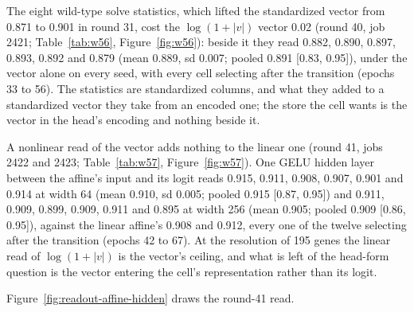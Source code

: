 The eight wild-type solve statistics, which lifted the standardized vector from
0.871 to 0.901 in round 31, cost the $\log(1 + |v|)$ vector 0.02 (round 40, job
2421; Table~\ref{tab:w56}, Figure~\ref{fig:w56}): beside it they read 0.882, 0.890,
0.897, 0.893, 0.892 and 0.879 (mean 0.889, sd 0.007; pooled 0.891 [0.83, 0.95]),
under the vector alone on every seed, with every cell selecting after the transition
(epochs 33 to 56). The statistics are standardized columns, and what they added to
a standardized vector they take from an encoded one; the store the cell wants is the
vector in the head's encoding and nothing beside it.




A nonlinear read of the vector adds nothing to the linear one (round 41, jobs 2422 and
2423; Table~\ref{tab:w57}, Figure~\ref{fig:w57}). One GELU hidden layer between the
affine's input and its logit reads 0.915, 0.911, 0.908, 0.907, 0.901 and 0.914 at
width 64 (mean 0.910, sd 0.005; pooled 0.915 [0.87, 0.95]) and 0.911, 0.909, 0.899,
0.909, 0.911 and 0.895 at width 256 (mean 0.905; pooled 0.909 [0.86, 0.95]), against
the linear affine's 0.908 and 0.912, every one of the twelve selecting after the
transition (epochs 42 to 67). At the resolution of 195 genes the linear read of
$\log(1 + |v|)$ is the vector's ceiling, and what is left of the head-form question is
the vector entering the cell's representation rather than its logit.

Figure~\ref{fig:readout-affine-hidden} draws the round-41 read.


